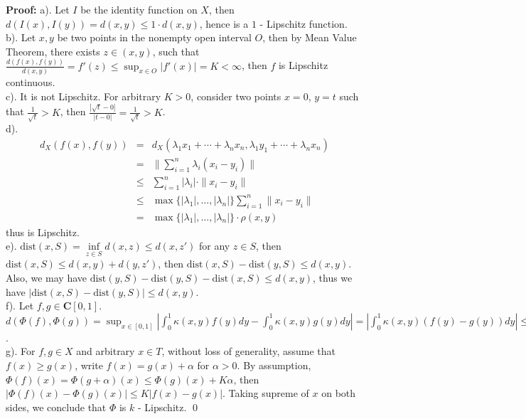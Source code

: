\documentclass[12pt]{article}
\begin{document}
\textbf{Proof:} a). Let $I$ be the identity function on $X$, then $d(I(x), I(y))=d(x,y)\leq 1\cdot d(x,y)$, hence is a $1$ - Lipschitz function.  \\
\indent b). Let $x, y$ be two points in the nonempty open interval $O$, then by Mean Value Theorem, there exists $z\in (x, y)$, such that $\frac{d(f(x), f(y))}{d(x, y)}=f'(z)\leq \sup_{x\in O}|f'(x)|=K<\infty$, then $f$ is Lipschitz continuous.  \\
\indent c). It is not Lipschitz. For arbitrary $K>0$, consider two points $x=0$, $y=t$ such that $\frac{1}{\sqrt{t}}>K$, then $\frac{|\sqrt{t}-0|}{|t-0|}=\frac{1}{\sqrt{t}}>K$.  \\
\indent d).
\begin{eqnarray*}
d_{X}(f(x),f(y))&=&d_{X}(\lambda_{1}x_{1}+\cdots+\lambda_{n}x_{n},\lambda_{1}y_{1}+\cdots+\lambda_{n}x_{n}) \\
&=&\|\sum\limits_{i=1}^{n}\lambda_{i}(x_{i}-y_{i})\| \\
&\leq& \sum\limits_{i=1}^{n}|\lambda_{i}|\cdot \|x_{i}-y_{i}\| \\
&\leq& \max\{|\lambda_{1}|, \dots, |\lambda_{n}|\}\sum\limits_{i=1}^{n}\|x_{i}-y_{i}\| \\
&=& \max\{|\lambda_{1}|, \dots, |\lambda_{n}|\}\cdot\rho(x,y)
\end{eqnarray*} thus is Lipschitz. \\
\indent e). $\text{dist}(x, S)=\inf\limits_{z\in S}d(x, z)\leq d(x, z')$ for any $z\in S$, then $\text{dist}(x, S)\leq d(x, y)+d(y, z')$, then $\text{dist}(x, S)-\text{dist}(y, S)\leq d(x, y)$. Also, we may have $\text{dist}(y, S)-\text{dist}(y, S)-\text{dist}(x, S)\leq d(x,y)$, thus we have $|\text{dist}(x, S)-\text{dist}(y,S)|\leq d(x, y)$. \\
\indent f). Let $f, g\in \mathbf{C}[0, 1]$. $d(\Phi(f), \Phi(g))=\sup_{x\in [0, 1]}\left|\int_{0}^{1}\kappa(x, y)f(y)dy-\int_{0}^{1}\kappa(x,y)g(y)dy\right|=\left|\int_{0}^{1}\kappa(x,y)\left(f(y)-g(y)\right)dy\right|\leq \|\kappa\|_{\infty}\int_{0}^{1}\left|f(y)-g(y)\right|dy\leq \|\kappa\|_{\infty}\sup_{y\in[0, 1]}\left|f(y)-g(y)\right|=\|\kappa\|_{\infty}d(f,g)$. \\
\indent g). For $f,g\in X$ and arbitrary $x\in T$, without loss of generality, assume that $f(x)\geq g(x)$, write $f(x)=g(x)+\alpha$ for $\alpha>0$. By assumption, $\Phi(f)(x)=\Phi(g+\alpha)(x)\leq \Phi(g)(x)+K\alpha$, then $|\Phi(f)(x)-\Phi(g)(x)|\leq K|f(x)-g(x)|$. Taking supreme of $x$ on both sides, we conclude that $\Phi$ is $k$ - Lipschitz. \qed \\
\end{document}
